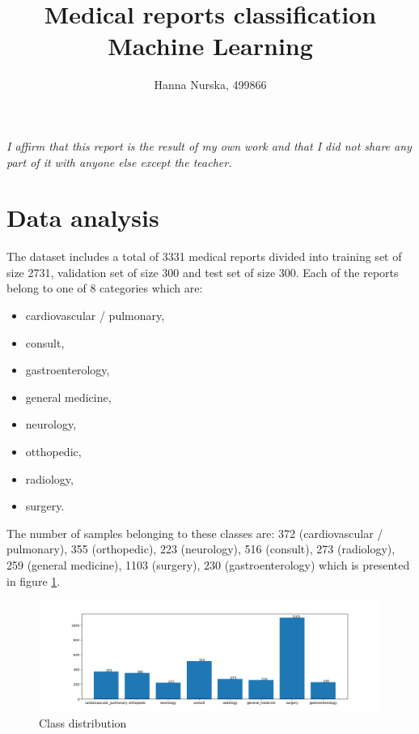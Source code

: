 \documentclass{article}
\title{Medical reports classification \\ \large Machine Learning}
\author{Hanna Nurska, 499866}
\begin{document}
\maketitle
\begin{center}
    \textit{I affirm that this report is the result of my own work and that I did not share any part of it with anyone else except the teacher.}
\end{center}

\newpage


\section{Data analysis}
The dataset includes a total of 3331 medical reports divided into training set of size 2731, validation set of size 300 and test set of size 300. Each of the reports belong to one of 8 categories which are:
\begin{itemize}
    \item cardiovascular / pulmonary,
    \item consult,
    \item gastroenterology,
    \item general medicine,
    \item neurology,
    \item otthopedic,
    \item radiology,
    \item surgery.
\end{itemize}

The number of samples belonging to these classes are: 372 (cardiovascular / pulmonary), 355 (orthopedic), 223 (neurology), 516 (consult), 273 (radiology), 259 (general medicine), 1103 (surgery), 230 (gastroenterology) which is presented in figure \ref{fig:class_distr}.
\begin{figure}[!ht]
    \centering
    \includegraphics[width=\textwidth]{images/classes_distr.png}
    \caption{Class distribution}
    \label{fig:class_distr}
\end{figure}
\end{document}
